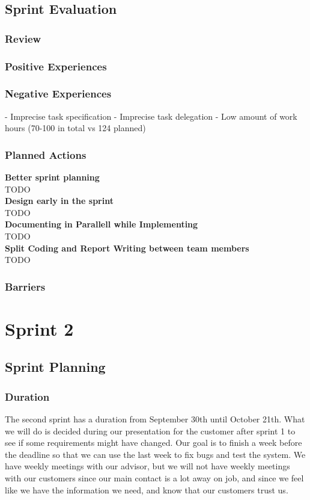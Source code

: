 \documentclass{report}
\begin{document}
\section{Sprint Evaluation} \label{sec:sprint_eva}
\subsection{Review} \label{subsec:review}
\subsection{Positive Experiences} \label{subsec:pos_exp}
\subsection{Negative Experiences} \label{subsec:neg_exp}
- Imprecise task specification
- Imprecise task delegation
- Low amount of work hours (70-100 in total vs 124 planned)
\subsection{Planned Actions} \label{subsec:planned_act}
\textbf{Better sprint planning}\\
TODO \\
\textbf{Design early in the sprint}\\
TODO\\
\textbf{Documenting in Parallell while Implementing}\\
TODO\\
\textbf{Split Coding and Report Writing between team members}\\
TODO
\subsection{Barriers} \label{subsec:barriers}

\chapter{Sprint 2} \label{cha:sprint_2}
\section{Sprint Planning} \label{sec:sprint_planning}
\subsection{Duration} \label{subsec:duration}
The second sprint has a duration from September 30th until October 21th. What we will do is decided during our presentation for the customer after sprint 1 to see if some requirements might have changed. Our goal is to finish a week before the deadline so that we can use the last week to fix bugs and test the system. We have weekly meetings with our advisor, but we will not have weekly meetings with our customers since our main contact is a lot away on job, and since we feel like we have the information we need, and know that our customers trust us.
\end{document}
